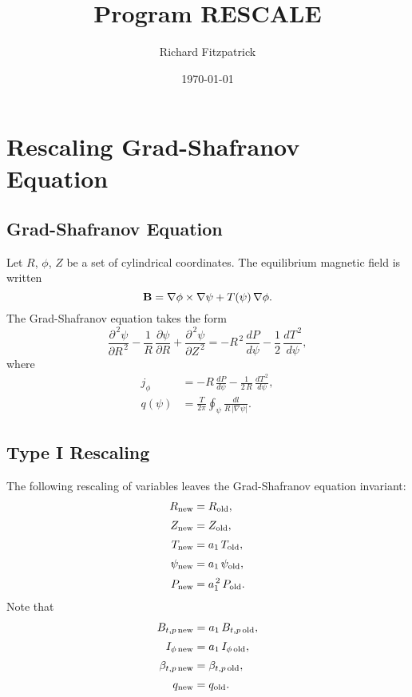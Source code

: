 \documentclass[12pt]{article}
\title{\bf Program {\sc RESCALE}}
\date{\today}
\author{Richard Fitzpatrick}
\begin{document}
\maketitle

\section{Rescaling Grad-Shafranov Equation}
\subsection{Grad-Shafranov Equation}
Let $R$, $\phi$, $Z$ be a set of cylindrical coordinates. 
The equilibrium magnetic field is written
\begin{equation}
{\bf B} = \nabla\phi\times\nabla\psi + T(\psi)\,\nabla\phi.
\end{equation}
The Grad-Shafranov equation takes the form
\begin{equation}
\frac{\partial^{\,2}\psi}{\partial R^{\,2}}-\frac{1}{R}\,\frac{\partial\psi}{\partial R} + \frac{\partial^{\,2}\psi}{\partial Z^{\,2}} = -R^{\,2}\,\frac{dP}{d\psi} - \frac{1}{2}\,\frac{dT^{\,2}}{d\psi},
\end{equation}
where
\begin{align}
j_\phi &= -R\,\frac{dP}{d\psi}- \frac{1}{2\,R}\,\frac{dT^{\,2}}{d\psi},\\[0.5ex]
q(\psi) &= \frac{T}{2\pi}\oint_\psi \frac{dl}{R\,|\nabla \psi|}.
\end{align}

\subsection{Type I Rescaling}
The following rescaling of variables leaves the Grad-Shafranov equation invariant:
\begin{align}
R_{\rm new}&=R_{\rm old},\\[0.5ex]
Z_{\rm new}&=Z_{\rm old},\\[0.5ex]
T_{\rm new} &=a_1\,T_{\rm old},\\[0.5ex]
\psi_{\rm new} &= a_1\,\psi_{\rm old},\\[0.5ex]
P_{\rm new} &=a_1^{\,2}\,P_{\rm old}.
\end{align}
Note that
\begin{align}
B_{t,p\,{\rm new}} &= a_1\,B_{t,p\,{\rm old}},\\[0.5ex]
I_{\phi\,{\rm new}} &= a_1\,I_{\phi\,{\rm old}},\\[0.5ex]
\beta_{t,p\,{\rm new}} &=\beta_{t,p\,{\rm old}},\\[0.5ex]
q_{\rm new} &= q_{\rm old}.
\end{align} 
\end{document}
